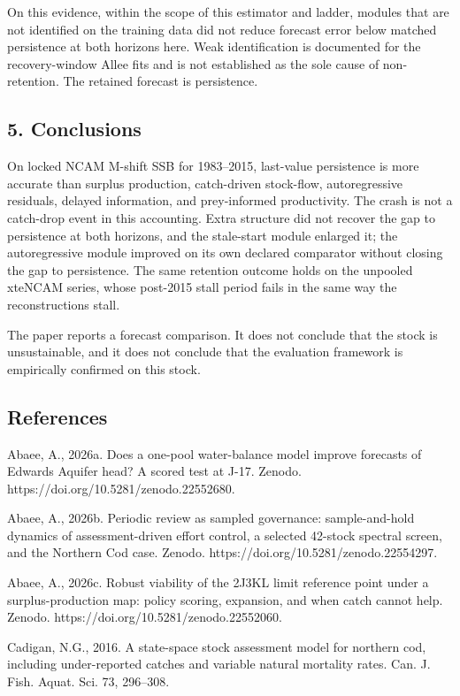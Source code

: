 \documentclass[11pt]{article}
\begin{document}
On this evidence, within the scope of this estimator and ladder, modules
that are not identified on the training data did not reduce forecast
error below matched persistence at both horizons here. Weak
identification is documented for the recovery-window Allee fits and is
not established as the sole cause of non-retention. The retained
forecast is persistence.

\subsection{5. Conclusions}\label{conclusions}

On locked NCAM M-shift SSB for 1983--2015, last-value persistence is
more accurate than surplus production, catch-driven stock-flow,
autoregressive residuals, delayed information, and prey-informed
productivity. The crash is not a catch-drop event in this accounting.
Extra structure did not recover the gap to persistence at both
horizons, and the stale-start module enlarged it; the autoregressive
module improved on its own declared comparator without closing the gap
to persistence. The same
retention outcome holds on the unpooled xteNCAM series, whose post-2015
stall period fails in the same way the reconstructions stall.

The paper reports a forecast comparison. It does not conclude that the
stock is unsustainable, and it does not conclude that the evaluation
framework is empirically confirmed on this stock.

\subsection{References}\label{references}

Abaee, A., 2026a. Does a one-pool water-balance model improve forecasts
of Edwards Aquifer head? A scored test at J-17. Zenodo.
https://doi.org/10.5281/zenodo.22552680.

Abaee, A., 2026b. Periodic review as sampled governance: sample-and-hold
dynamics of assessment-driven effort control, a selected 42-stock
spectral screen, and the Northern Cod case. Zenodo.
https://doi.org/10.5281/zenodo.22554297.

Abaee, A., 2026c. Robust viability of the 2J3KL limit reference point
under a surplus-production map: policy scoring, expansion, and when
catch cannot help. Zenodo. https://doi.org/10.5281/zenodo.22552060.

Cadigan, N.G., 2016. A state-space stock assessment model for northern
cod, including under-reported catches and variable natural mortality
rates. Can. J. Fish. Aquat. Sci. 73, 296--308.
\end{document}
